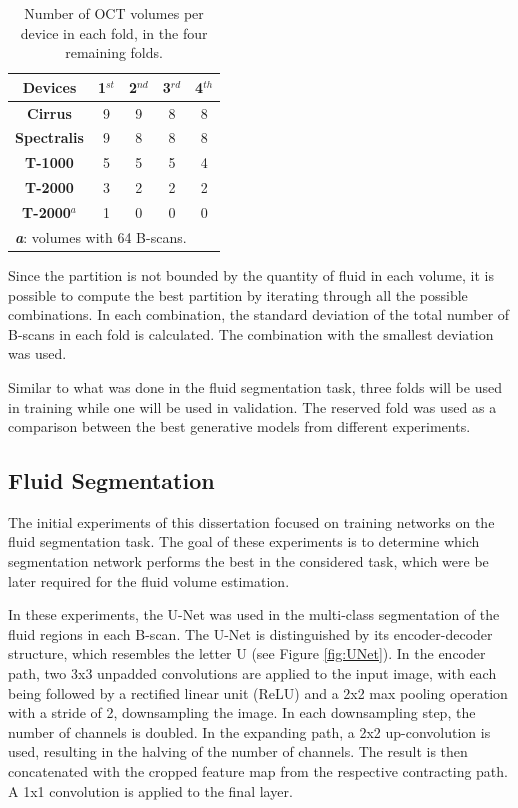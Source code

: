 \begin{table}[!ht]
	\setlength{\tabcolsep}{6pt}
	\renewcommand{\arraystretch}{1.3}
	\caption{Number of OCT volumes per device in each fold, in the four remaining folds.}
	\centering
	\begin{tabular}{|c|c|c|c|c|}
		\hline
		\textbf{Devices} & \textbf{1$^{st}$} & \textbf{2$^{nd}$} & \textbf{3$^{rd}$} & \textbf{4$^{th}$} \\
		\hline
		\textbf{Cirrus} & 9 & 9 & 8 & 8 \\
		\textbf{Spectralis} & 9 & 8 & 8 & 8 \\
		\textbf{T-1000} & 5 & 5 & 5 & 4 \\
		\textbf{T-2000} & 3 & 2 & 2 & 2 \\
		\textbf{T-2000$^{a}$} & 1 & 0 & 0 & 0 \\
		\hline
		\multicolumn{5}{l}{\textbf{\textit{a}}: volumes with 64 B-scans.} \\
	\end{tabular}
	\label{tab:FourFoldSplit}
\end{table}

Since the partition is not bounded by the quantity of fluid in each volume, it is possible to compute the best partition by iterating through all the possible combinations. In each combination, the standard deviation of the total number of B-scans in each fold is calculated. The combination with the smallest deviation was used. 
\par
Similar to what was done in the fluid segmentation task, three folds will be used in training while one will be used in validation. The reserved fold was used as a comparison between the best generative models from different experiments.

\subsection{Fluid Segmentation}
The initial experiments of this dissertation focused on training networks on the fluid segmentation task. The goal of these experiments is to determine which segmentation network performs the best in the considered task, which were be later required for the fluid volume estimation.
\par
In these experiments, the U-Net \parencite{Ronneberger2015} was used in the multi-class segmentation of the fluid regions in each B-scan. The U-Net is distinguished by its encoder-decoder structure, which resembles the letter U (see Figure \ref{fig:UNet}). In the encoder path, two 3x3 unpadded convolutions are applied to the input image, with each being followed by a rectified linear unit (ReLU) and a 2x2 max pooling operation with a stride of 2, downsampling the image. In each downsampling step, the number of channels is doubled. In the expanding path, a 2x2 up-convolution is used, resulting in the halving of the number of channels. The result is then concatenated with the cropped feature map from the respective contracting path. A 1x1 convolution is applied to the final layer.

